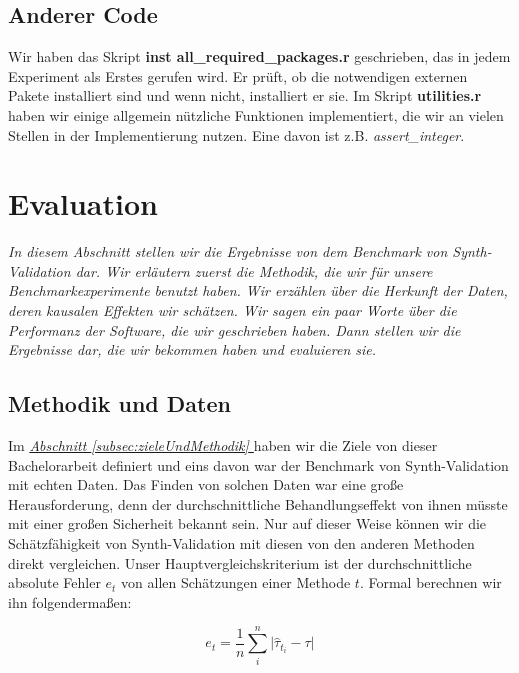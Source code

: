 \documentclass[12pt,a4paper,twoside]{scrartcl}
\numberwithin{equation}{section}
\newcommand{\refsec}[1]{\emph{\hyperref[#1]{Abschnitt \ref*{#1} }}}
\begin{document}
\subsection{Anderer Code}\label{subsec:andererCode}
Wir haben das Skript \textbf{inst all\_required\_packages.r} geschrieben, das in jedem Experiment als Erstes gerufen wird. Er prüft, ob die notwendigen externen Pakete installiert sind und wenn nicht, installiert er sie. Im Skript \textbf{utilities.r} haben wir einige allgemein nützliche Funktionen implementiert, die wir an vielen Stellen in der Implementierung nutzen. Eine davon ist z.B. \emph{assert\_integer}.

\clearpage

\section{Evaluation}\label{sec:evaluation}
\noindent
\emph{In diesem Abschnitt stellen wir die Ergebnisse von dem Benchmark von Synth-Validation dar. Wir erläutern zuerst die Methodik, die wir für unsere Benchmarkexperimente benutzt haben. Wir erzählen über die Herkunft der Daten, deren kausalen Effekten wir schätzen. Wir sagen ein paar Worte über die Performanz der Software, die wir geschrieben haben. Dann stellen wir die Ergebnisse dar, die wir bekommen haben und evaluieren sie.}\par

\subsection{Methodik und Daten}\label{subsec:methodikDaten}
Im \refsec{subsec:zieleUndMethodik} haben wir die Ziele von dieser Bachelorarbeit definiert und eins davon war der Benchmark von Synth-Validation mit echten Daten. Das Finden von solchen Daten war eine große Herausforderung, denn der durchschnittliche Behandlungseffekt von ihnen müsste mit einer großen Sicherheit bekannt sein. Nur auf dieser Weise können wir die Schätzfähigkeit von Synth-Validation mit diesen von den anderen Methoden direkt vergleichen. Unser Hauptvergleichskriterium ist der durchschnittliche absolute Fehler $e_t$ von allen Schätzungen einer Methode $t$. Formal berechnen wir ihn folgendermaßen:\par

\begin{equation}\label{eq:5.1}
 e_t = \frac{1}{n} \sum_{i}^n \big | \hat{\tau}_{t_i} - \tau \big | 
\end{equation}
\end{document}
